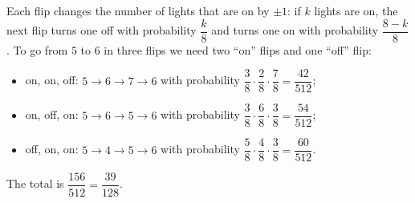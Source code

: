 Each flip changes the number of lights that are on by $\pm1$: if $k$ lights are on, the next flip turns one off with probability $\dfrac {k}{8}$ and turns one on with probability $\dfrac{8-k}{8}$. To go from $5$ to $6$ in three flips we need two ``on'' flips and one ``off'' flip:
\begin{itemize}
\item on, on, off: $5\to6\to7\to6$ with probability $\dfrac{3}{8}\cdot\dfrac{2}{8}\cdot\dfrac{7}{8}=\dfrac{42}{512}$;
\item on, off, on: $5\to6\to5\to6$ with probability $\dfrac{3}{8}\cdot\dfrac{6}{8}\cdot\dfrac{3}{8}=\dfrac{54}{512}$;
\item off, on, on: $5\to4\to5\to6$ with probability $\dfrac{5}{8}\cdot\dfrac{4}{8}\cdot\dfrac{3}{8}=\dfrac{60}{512}$.
\end{itemize}
The total is $\dfrac{156}{512}=\boxed{\dfrac{39}{128}}$.
